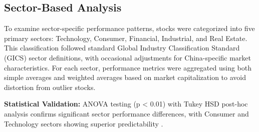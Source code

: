 \documentclass[3p,times,procedia]{elsarticle}
\begin{document}
\subsection{Sector-Based Analysis}
To examine sector-specific performance patterns, stocks were categorized into five primary sectors: Technology, Consumer, Financial, Industrial, and Real Estate. This classification followed standard Global Industry Classification Standard (GICS) sector definitions, with occasional adjustments for China-specific market characteristics. For each sector, performance metrics were aggregated using both simple averages and weighted averages based on market capitalization to avoid distortion from outlier stocks.

\begin{table}[!ht]
\centering
\caption{\textbf{Sector-wise Average Performance Metrics}}
\end{table}

\textbf{Statistical Validation:} ANOVA testing (p < 0.01) with Tukey HSD post-hoc analysis confirms significant sector performance differences, with Consumer and Technology sectors showing superior predictability \cite{Box1970,Tukey1949}.
\end{document}
